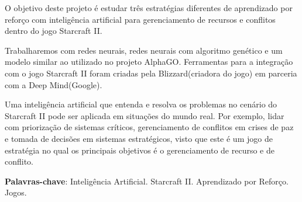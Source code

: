 \setlength{\absparsep}{18pt} %
\begin{resumo}
O objetivo deste projeto é estudar três estratégias diferentes de aprendizado por reforço com inteligência artificial para gerenciamento de recursos e conflitos dentro do jogo Starcraft II. 

Trabalharemos com redes neurais, redes neurais com algoritmo genético e um modelo similar ao utilizado no projeto AlphaGO. Ferramentas para a integração com o jogo Starcraft II foram criadas pela Blizzard(criadora do jogo) em parceria com a Deep Mind(Google). 

Uma inteligência artificial que entenda e resolva os problemas no cenário do Starcraft II pode ser aplicada em situações do mundo real. Por exemplo, lidar com priorização de sistemas críticos, gerenciamento de conflitos em crises de paz e tomada de decisões em sistemas estratégicos, visto que este é um jogo de estratégia no qual os principais objetivos é o gerenciamento de recurso e de conflito.


 \textbf{Palavras-chave}: Inteligência Artificial. Starcraft II. Aprendizado por Reforço. Jogos.
\end{resumo}